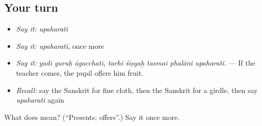 \subsection*{Your turn}
\begin{itemize}
\raggedright
  \item \emph{Say it:} \emph{upaharati}
  \item \emph{Say it:} \emph{upaharati}, once more
  \item \emph{Say it:} \emph{yadi guruḥ āgacchati, tarhi śiṣyaḥ tasmai phalāni upaharati.} — If the teacher comes, the pupil offers him fruit.
  \item \emph{Recall:} say the Sanskrit for fine cloth, then the Sanskrit for a girdle, then say \emph{upaharati} again
\end{itemize}

\begin{tcolorbox}[breakable,colback=teal!4,colframe=teal!35!black,title={Before you move on}]
What does  mean? (\textquotedblleft{}Presents; offers\textquotedblright{}.) Say it once more.
\end{tcolorbox}
